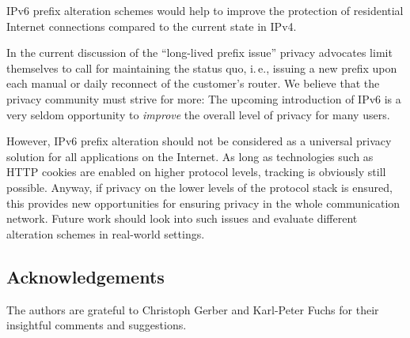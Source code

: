 \documentclass{easychair}
\begin{document}
IPv6 prefix alteration schemes would help to improve the protection of residential Internet connections compared to the current state in IPv4. 

In the current discussion of the ``long-lived prefix issue'' privacy advocates limit themselves to call for maintaining the status quo, i.\,e., issuing a new prefix upon each manual or daily reconnect of the customer's router. We believe that the privacy community must strive for more: The upcoming introduction of IPv6 is a very seldom opportunity to \emph{improve} the overall level of privacy for many users.

However, IPv6 prefix alteration should not be considered as a universal privacy solution for all applications on the Internet. As long as technologies such as HTTP cookies are enabled on higher protocol levels, tracking is obviously still possible. Anyway, if privacy on the lower levels of the protocol stack is ensured, this provides new opportunities for ensuring privacy in the whole communication network. Future work should look into such issues and evaluate different alteration schemes in real-world settings. 

\subsection*{Acknowledgements}

The authors are grateful to Christoph Gerber and Karl-Peter Fuchs for their insightful comments and suggestions.




\label{sect:bib}





\end{document}
